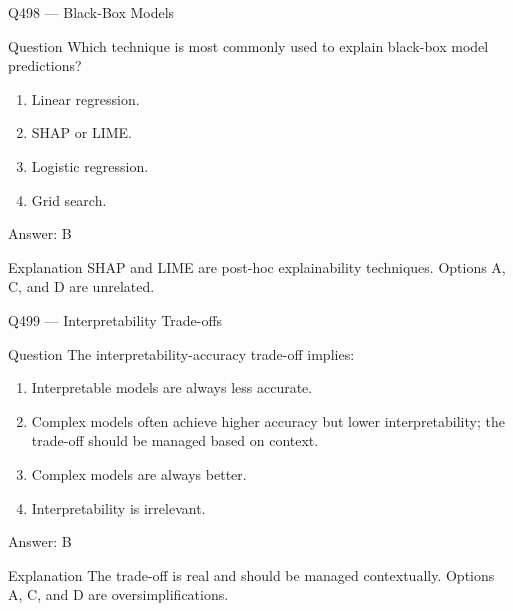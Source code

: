 \documentclass[aspectratio=169,8pt]{beamer}
\begin{document}
	\begin{frame}{Q498 --- Black-Box Models}
		\begin{block}{Question}
			Which technique is most commonly used to explain black-box model predictions?
			\begin{enumerate}
				\item Linear regression.
				\item SHAP or LIME.
				\item Logistic regression.
				\item Grid search.
			\end{enumerate}
		\end{block}
		\begin{exampleblock}{Answer: B}\end{exampleblock}
		\begin{block}{Explanation}
			SHAP and LIME are post-hoc explainability techniques. Options A, C, and D are unrelated.
		\end{block}
	\end{frame}
	
	\begin{frame}{Q499 --- Interpretability Trade-offs}
		\begin{block}{Question}
			The interpretability-accuracy trade-off implies:
			\begin{enumerate}
				\item Interpretable models are always less accurate.
				\item Complex models often achieve higher accuracy but lower interpretability; the trade-off should be managed based on context.
				\item Complex models are always better.
				\item Interpretability is irrelevant.
			\end{enumerate}
		\end{block}
		\begin{exampleblock}{Answer: B}\end{exampleblock}
		\begin{block}{Explanation}
			The trade-off is real and should be managed contextually. Options A, C, and D are oversimplifications.
		\end{block}
	\end{frame}
	
\end{document}
